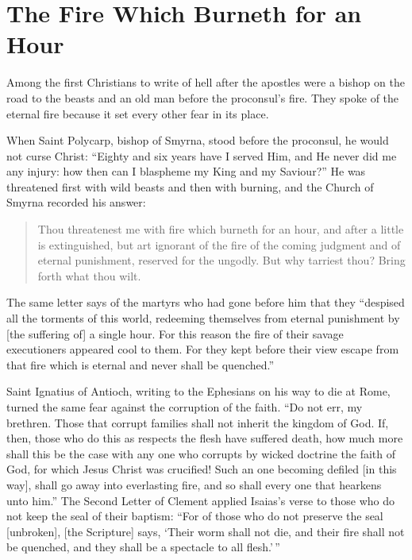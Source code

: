 \section{The Fire Which Burneth for an Hour}

Among the first Christians to write of hell after the apostles were a bishop on the road to the beasts and an old man before the proconsul's fire. They spoke of the eternal fire because it set every other fear in its place.

When Saint Polycarp, bishop of Smyrna, stood before the proconsul, he would not curse Christ: ``Eighty and six years have I served Him, and He never did me any injury: how then can I blaspheme my King and my Saviour?'' He was threatened first with wild beasts and then with burning, and the Church of Smyrna recorded his answer:

\begin{quote}
Thou threatenest me with fire which burneth for an hour, and after a little is extinguished, but art ignorant of the fire of the coming judgment and of eternal punishment, reserved for the ungodly. But why tarriest thou? Bring forth what thou wilt.
\end{quote}

\noindent The same letter says of the martyrs who had gone before him that they ``despised all the torments of this world, redeeming themselves from eternal punishment by [the suffering of] a single hour. For this reason the fire of their savage executioners appeared cool to them. For they kept before their view escape from that fire which is eternal and never shall be quenched.''

Saint Ignatius of Antioch, writing to the Ephesians on his way to die at Rome, turned the same fear against the corruption of the faith. ``Do not err, my brethren. Those that corrupt families shall not inherit the kingdom of God. If, then, those who do this as respects the flesh have suffered death, how much more shall this be the case with any one who corrupts by wicked doctrine the faith of God, for which Jesus Christ was crucified! Such an one becoming defiled [in this way], shall go away into everlasting fire, and so shall every one that hearkens unto him.'' The Second Letter of Clement applied Isaias's verse to those who do not keep the seal of their baptism: ``For of those who do not preserve the seal [unbroken], [the Scripture] says, `Their worm shall not die, and their fire shall not be quenched, and they shall be a spectacle to all flesh.'\,''

